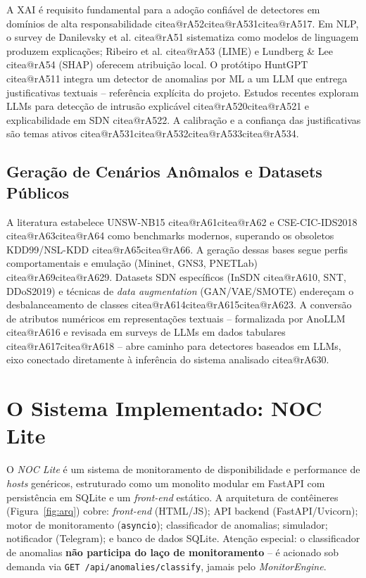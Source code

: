 \documentclass[12pt,a4paper]{article}
\makeatletter
\newcommand{\citea}[1]{\begingroup\edef\@currentlabel{\csname citea@#1\endcsname}\@currentlabel\endgroup}
\makeatother
\begin{document}
A XAI é requisito fundamental para a adoção confiável de detectores em domínios
de alta responsabilidade \citea{rA52}\citea{rA531}\citea{rA517}. Em NLP, o survey de Danilevsky et
al. \citea{rA51} sistematiza como modelos de linguagem produzem explicações; Ribeiro
et al. \citea{rA53} (LIME) e Lundberg \& Lee \citea{rA54} (SHAP) oferecem atribuição local.
O protótipo HuntGPT \citea{rA511} integra um detector de anomalias por ML a um LLM
que entrega justificativas textuais -- referência explícita do projeto. Estudos
recentes exploram LLMs para detecção de intrusão explicável \citea{rA520}\citea{rA521} e
explicabilidade em SDN \citea{rA522}. A calibração e a confiança das justificativas
são temas ativos \citea{rA531}\citea{rA532}\citea{rA533}\citea{rA534}.

\subsection{Geração de Cenários Anômalos e Datasets Públicos}
\label{sec:datasets}

A literatura estabelece UNSW-NB15 \citea{rA61}\citea{rA62} e CSE-CIC-IDS2018 \citea{rA63}\citea{rA64} como
benchmarks modernos, superando os obsoletos KDD99/NSL-KDD \citea{rA65}\citea{rA66}. A
geração dessas bases segue perfis comportamentais e emulação (Mininet,
GNS3, PNETLab) \citea{rA69}\citea{rA629}. Datasets SDN específicos (InSDN
\citea{rA610}, SNT, DDoS2019) e técnicas de \textit{data augmentation} (GAN/VAE/SMOTE)
endereçam o desbalanceamento de classes \citea{rA614}\citea{rA615}\citea{rA623}. A conversão de
atributos numéricos em representações textuais -- formalizada por AnoLLM
\citea{rA616} e revisada em surveys de LLMs em dados tabulares \citea{rA617}\citea{rA618} -- abre
caminho para detectores baseados em LLMs, eixo conectado diretamente à
inferência do sistema analisado \citea{rA630}.

\section{O Sistema Implementado: NOC Lite}
\label{sec:sistema}

O \textit{NOC Lite} é um sistema de monitoramento de disponibilidade e
performance de \textit{hosts} genéricos, estruturado como um monolito modular em
FastAPI com persistência em SQLite e um \textit{front-end} estático. A
arquitetura de contêineres (Figura~\ref{fig:arq}) cobre: \textit{front-end}
(HTML/JS); API backend (FastAPI/Uvicorn); motor de monitoramento
(\texttt{asyncio}); classificador de anomalias; simulador; notificador
(Telegram); e banco de dados SQLite. Atenção especial: o classificador de
anomalias \textbf{não participa do laço de monitoramento} -- é acionado sob
demanda via \texttt{GET /api/anomalies/classify}, jamais pelo
\textit{MonitorEngine}.
\end{document}
